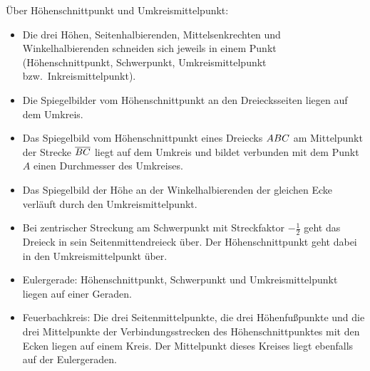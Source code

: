 \documentclass[11pt,a4paper]{article}
\begin{document}
Über Höhenschnittpunkt und Umkreismittelpunkt:
\begin{itemize}
\item Die drei Höhen, Seitenhalbierenden, Mittelsenkrechten und
  Winkelhalbierenden schneiden sich jeweils in einem Punkt (Höhenschnittpunkt,
  Schwerpunkt, Umkreismittelpunkt bzw.\ Inkreismittelpunkt).
\item Die Spiegelbilder vom Höhenschnittpunkt an den Dreiecksseiten liegen auf
  dem Umkreis.
\item Das Spiegelbild vom Höhenschnittpunkt eines Dreiecks $\ktriangle*{ABC}$
  am Mittelpunkt der Strecke $\overline{{\mathnormal{BC}}}$ liegt auf dem Umkreis und bildet
  verbunden mit dem Punkt $A$ einen Durchmesser des Umkreises.
\item Das Spiegelbild der Höhe an der Winkelhalbierenden der gleichen Ecke
  verläuft durch den Umkreismittelpunkt.
\item Bei zentrischer Streckung am Schwerpunkt mit Streckfaktor $-\frac{1}{2}$
  geht das Dreieck in sein Seitenmittendreieck über. Der Höhenschnittpunkt
  geht dabei in den Umkreismittelpunkt über.
\item Eulergerade: Höhenschnittpunkt, Schwerpunkt und Umkreismittelpunkt
  liegen auf einer Geraden.
\item Feuerbachkreis: Die drei Seitenmittelpunkte, die drei Höhenfußpunkte und
  die drei Mittelpunkte der Verbindungsstrecken des Höhenschnittpunktes mit
  den Ecken liegen auf einem Kreis. Der Mittelpunkt dieses Kreises liegt
  ebenfalls auf der Eulergeraden.
\end{itemize}
\end{document}
